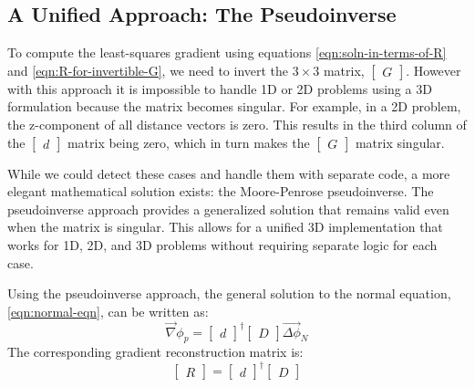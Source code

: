 \subsection{A Unified Approach: The Pseudoinverse}

To compute the least-squares gradient using equations \ref{eqn:soln-in-terms-of-R} and \ref{eqn:R-for-invertible-G}, we need to invert the $3 \times 3$ matrix, $\begin{bmatrix}G\end{bmatrix}$. However with this approach it is impossible to handle 1D or 2D problems using a 3D formulation because the matrix becomes singular. For example, in a 2D problem, the z-component of all distance vectors is zero. This results in the third column of the $\begin{bmatrix}d\end{bmatrix}$ matrix being zero, which in turn makes the $\begin{bmatrix}G\end{bmatrix}$ matrix singular.

While we could detect these cases and handle them with separate code, a more elegant mathematical solution exists: the Moore-Penrose pseudoinverse. The pseudoinverse approach provides a generalized solution that remains valid even when the matrix is singular. This allows for a unified 3D implementation that works for 1D, 2D, and 3D problems without requiring separate logic for each case.

Using the pseudoinverse approach, the general solution to the normal equation, \ref{eqn:normal-eqn}, can be written as:
\begin{equation}
	\vec{\nabla}\phi_p = \begin{bmatrix}d\end{bmatrix}^{\dagger} \begin{bmatrix}D\end{bmatrix} \vec{\Delta\phi}_N
	\label{eqn:least-squares-gradient-general}
\end{equation}
The corresponding gradient reconstruction matrix is:
\begin{equation}
	\begin{bmatrix}R\end{bmatrix} = \begin{bmatrix}d\end{bmatrix}^{\dagger} \begin{bmatrix}D\end{bmatrix}
\end{equation}

